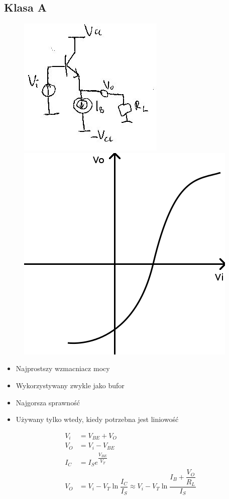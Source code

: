 \documentclass[10pt,a4paper]{article}
\begin{document}
\subsection{Klasa A}
\begin{figure}[H]
\centering
\includegraphics[scale=1]{wzm_moc_a}
\includegraphics[scale=0.5]{wzm_moc_a_wyk}
\end{figure}
\begin{itemize}
\item{Najprostszy wzmacniacz mocy}
\item{Wykorzystywany zwykle jako bufor}
\item{Najgorsza sprawność}
\item{Używany tylko wtedy, kiedy potrzebna jest liniowość}
\end{itemize}
\begin{align*}
V_i &= V_{BE}+V_O \\
V_O&=V_i-V_{BE} \\
I_C&=I_S e^{\dfrac{V_{BE}}{V_T}} \\
V_O &= V_i -V_T \ln \dfrac{I_C}{I_S} \approx V_i - V_T \ln \dfrac{I_B + \dfrac{V_O}{R_L}}{I_S}
\end{align*}
\end{document}
